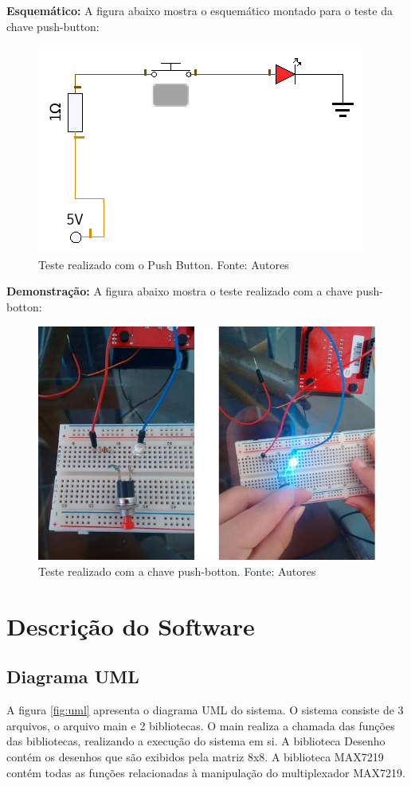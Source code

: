\documentclass[conference]{IEEEtran}
\begin{document}
\textbf{Esquemático:}
A figura abaixo mostra o esquemático montado para o teste da chave push-button:

\begin{figure}[H]
  \centering
  \includegraphics[width=0.5\linewidth]{esq1}
  \caption{Teste realizado com o Push Button. Fonte: Autores}
  \label{fig:dem_push}
\end{figure}

\textbf{Demonstração:}
A figura abaixo mostra o teste realizado com a chave push-botton:
\begin{figure}[H]
  \centering
  \includegraphics[width=0.5\linewidth]{push-bottom}
  \caption{Teste realizado com a chave push-botton. Fonte: Autores}
  \label{fig:dem_push_botton}
\end{figure}

\section{Descrição do Software}
\subsection{Diagrama UML}
A figura \ref{fig:uml} apresenta o diagrama UML do sistema. O sistema consiste de 3 arquivos, o arquivo main e 2 bibliotecas. O main realiza a chamada das funções das bibliotecas, realizando a execução do sistema em si. A biblioteca Desenho contém os desenhos que são exibidos pela matriz 8x8. A biblioteca MAX7219 contém todas as funções relacionadas à manipulação do multiplexador MAX7219. 
\end{document}
